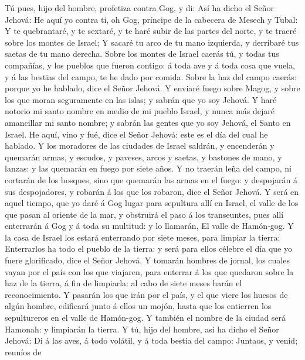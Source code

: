  Tú pues, hijo del hombre, profetiza contra Gog, y di: Así
ha dicho el Señor Jehová: He aquí yo contra ti, oh Gog, príncipe de la
cabecera de Mesech y Tubal:  Y te quebrantaré, y te
sextaré, y te haré subir de las partes del norte, y te traeré sobre los
montes de Israel;  Y sacaré tu arco de tu mano izquierda,
y derribaré tus saetas de tu mano derecha.  Sobre los
montes de Israel caerás tú, y todas tus compañías, y los pueblos que
fueron contigo: á toda ave y á toda cosa que vuela, y á las bestias del
campo, te he dado por comida.  Sobre la haz del campo
caerás: porque yo he hablado, dice el Señor Jehová.  Y
enviaré fuego sobre Magog, y sobre los que moran seguramente en las
islas; y sabrán que yo soy Jehová.  Y haré notorio mi
santo nombre en medio de mi pueblo Israel, y nunca más dejaré amancillar
mi santo nombre; y sabrán las gentes que yo soy Jehová, el Santo en
Israel.  He aquí, vino y fué, dice el Señor Jehová: este
es el día del cual he hablado.  Y los moradores de las
ciudades de Israel saldrán, y encenderán y quemarán armas, y escudos, y
paveses, arcos y saetas, y bastones de mano, y lanzas: y las quemarán en
fuego por siete años.  Y no traerán leña del campo, ni
cortarán de los bosques, sino que quemarán las armas en el fuego: y
despojarán á sus despojadores, y robarán á los que los robaron, dice el
Señor Jehová.  Y será en aquel tiempo, que yo daré á Gog
lugar para sepultura allí en Israel, el valle de los que pasan al
oriente de la mar, y obstruirá el paso á los transeuntes, pues allí
enterrarán á Gog y á toda su multitud: y lo llamarán, El valle de
Hamón-gog.  Y la casa de Israel los estará enterrando por
siete meses, para limpiar la tierra:  Enterrarlos ha todo
el pueblo de la tierra: y será para ellos célebre el día que yo fuere
glorificado, dice el Señor Jehová.  Y tomarán hombres de
jornal, los cuales vayan por el país con los que viajaren, para enterrar
á los que quedaron sobre la haz de la tierra, á fin de limpiarla: al
cabo de siete meses harán el reconocimiento.  Y pasarán
los que irán por el país, y el que viere los huesos de algún hombre,
edificará junto á ellos un mojón, hasta que los entierren los
sepultureros en el valle de Hamón-gog.  Y también el
nombre de la ciudad será Hamonah: y limpiarán la tierra. 
Y tú, hijo del hombre, así ha dicho el Señor Jehová: Di á las aves, á
todo volátil, y á toda bestia del campo: Juntaos, y venid; reuníos de
